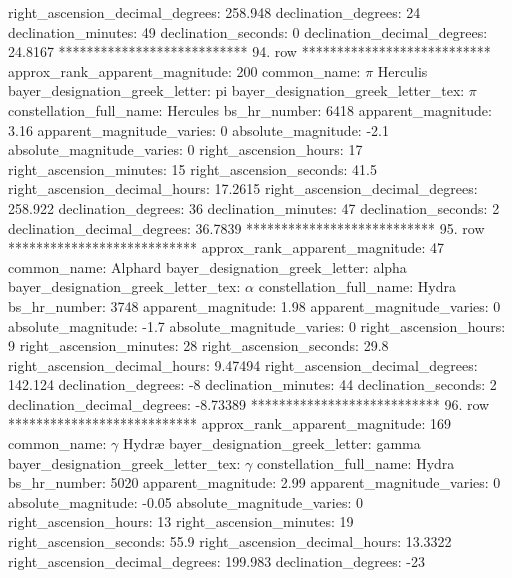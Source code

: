    right_ascension_decimal_degrees: 258.948
               declination_degrees: 24
               declination_minutes: 49
               declination_seconds: 0
       declination_decimal_degrees: 24.8167
*************************** 94. row ***************************
    approx_rank_apparent_magnitude: 200
                       common_name: $\pi$ Herculis
    bayer_designation_greek_letter: pi
bayer_designation_greek_letter_tex: $\pi$
           constellation_full_name: Hercules
                      bs_hr_number: 6418
                apparent_magnitude: 3.16
         apparent_magnitude_varies: 0
                absolute_magnitude: -2.1
         absolute_magnitude_varies: 0
             right_ascension_hours: 17
           right_ascension_minutes: 15
           right_ascension_seconds: 41.5
     right_ascension_decimal_hours: 17.2615
   right_ascension_decimal_degrees: 258.922
               declination_degrees: 36
               declination_minutes: 47
               declination_seconds: 2
       declination_decimal_degrees: 36.7839
*************************** 95. row ***************************
    approx_rank_apparent_magnitude: 47
                       common_name: Alphard
    bayer_designation_greek_letter: alpha
bayer_designation_greek_letter_tex: $\alpha$
           constellation_full_name: Hydra
                      bs_hr_number: 3748
                apparent_magnitude: 1.98
         apparent_magnitude_varies: 0
                absolute_magnitude: -1.7
         absolute_magnitude_varies: 0
             right_ascension_hours: 9
           right_ascension_minutes: 28
           right_ascension_seconds: 29.8
     right_ascension_decimal_hours: 9.47494
   right_ascension_decimal_degrees: 142.124
               declination_degrees: -8
               declination_minutes: 44
               declination_seconds: 2
       declination_decimal_degrees: -8.73389
*************************** 96. row ***************************
    approx_rank_apparent_magnitude: 169
                       common_name: $\gamma$ Hydr{\ae}
    bayer_designation_greek_letter: gamma
bayer_designation_greek_letter_tex: $\gamma$
           constellation_full_name: Hydra
                      bs_hr_number: 5020
                apparent_magnitude: 2.99
         apparent_magnitude_varies: 0
                absolute_magnitude: -0.05
         absolute_magnitude_varies: 0
             right_ascension_hours: 13
           right_ascension_minutes: 19
           right_ascension_seconds: 55.9
     right_ascension_decimal_hours: 13.3322
   right_ascension_decimal_degrees: 199.983
               declination_degrees: -23
